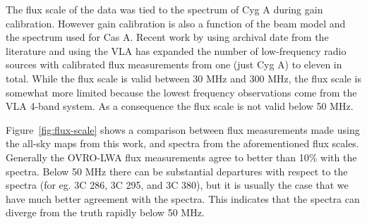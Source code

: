 \documentclass[twocolumn]{aastex61}
\begin{document}
\begin{figure*}[p]
    \caption{
        This figure shows the measured fluxes (black points) of 11 sources plotted against the
        published spectra from \citet{2017ApJS..230....7P} (solid line), \citet{2012MNRAS.423L..30S}
        (dashed line), and \citet{1977A&A....61...99B} (dot-dash line).
    }
    \label{fig:flux-scale}
\end{figure*}
\begin{figure*}[p]
    \addtocounter{figure}{-1}
    \caption{(continued)}
\end{figure*}

The flux scale of the data was tied to the \citet{1977A&A....61...99B} spectrum of Cyg A during gain
calibration. However gain calibration is also a function of the beam model and the spectrum used for
Cas A. Recent work by \citet{2012MNRAS.423L..30S} using archival date from the literature and
\citet{2017ApJS..230....7P} using the VLA has expanded the number of low-frequency radio sources
with calibrated flux measurements from one (just Cyg A) to eleven in total. While the
\citet{2012MNRAS.423L..30S} flux scale is valid between 30 MHz and 300 MHz, the
\citet{2017ApJS..230....7P} flux scale is somewhat more limited because the lowest frequency
observations come from the VLA 4-band system. As a consequence the \citet{2017ApJS..230....7P} flux
scale is not valid below 50 MHz.

Figure~\ref{fig:flux-scale} shows a comparison between flux measurements made using the all-sky maps
from this work, and spectra from the aforementioned flux scales. Generally the OVRO-LWA flux
measurements agree to better than 10\% with the \citet{2012MNRAS.423L..30S} spectra. Below 50 MHz
there can be substantial departures with respect to the \citet{2017ApJS..230....7P} spectra (for eg.
3C 286, 3C 295, and 3C 380), but it is usually the case that we have much better agreement with the
\citet{2012MNRAS.423L..30S} spectra. This indicates that the \citet{2017ApJS..230....7P} spectra can
diverge from the truth rapidly below 50 MHz.
\end{document}
